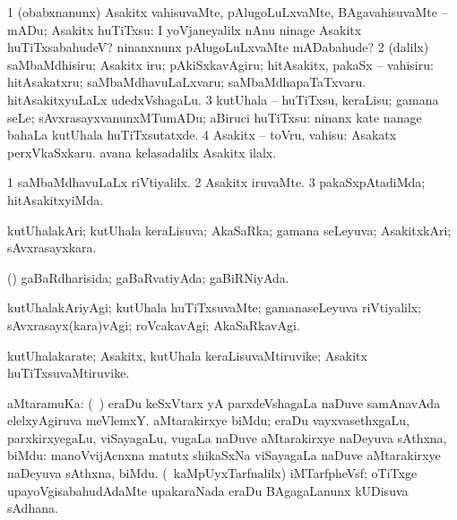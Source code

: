 \bentry
{}
\gl{\sakirx}
\bmng
\bnum
\num{1} (obabxnanunx) Asakitx vahisuvaMte, pAlugoLuLxvaMte, BAgavahisuvaMte -- mADu; Asakitx huTiTxsu:  I yoVjaneyalilx nAnu ninage Asakitx huTiTxsabahudeV? ninanxnunx pAlugoLuLxvaMte mADabahude? 
\num{2} (\BUkaq dalilx) saMbaMdhisiru; Asakitx iru; pAkiSxkavAgiru; hitAsakitx, pakaSx -- vahisiru:  hitAsakatxru; saMbaMdhavuLaLxvaru; saMbaMdhapaTaTxvaru.  hitAsakitxyuLaLx udedxVshagaLu. 
\num{3} kutUhala -- huTiTxsu, keraLisu; gamana seLe; sAvxrasayxvanunxMTumADu; aBiruci huTiTxsu:  ninanx kate nanage bahaLa kutUhala huTiTxsutatxde. 
\num{4} Asakitx -- toVru, vahisu:  Asakatx perxVkaSxkaru.  avana kelasadalilx Asakitx ilalx. 
\enum
\emng
\eentry

\bentry
{}
\gl{\kirxvi}
\bmng
\bnum
\num{1} saMbaMdhavuLaLx riVtiyalilx. 
\num{2} Asakitx iruvaMte. 
\num{3} pakaSxpAtadiMda; hitAsakitxyiMda. 
\enum
\emng
\eentry

\bentry
{}
\gl{\gu}
\bmng
kutUhalakAri; kutUhala keraLisuva; AkaSaRka; gamana seLeyuva; AsakitxkAri; sAvxrasayxkara. 
\emng

\noindent
\gl{\nuga}
\bmng
{} (\pArxparx) gaBaRdharisida; gaBaRvatiyAda; gaBiRNiyAda. 
\emng
\eentry

\bentry
{}
\gl{\kirxvi}
\bmng
kutUhalakAriyAgi; kutUhala huTiTxsuvaMte; gamanaseLeyuva riVtiyalilx; sAvxrasayx(kara)vAgi; roVcakavAgi; AkaSaRkavAgi. 
\emng
\eentry

\bentry
{}
\gl{\nA}
\bmng
kutUhalakarate; Asakitx, kutUhala keraLisuvaMtiruvike; Asakitx huTiTxsuvaMtiruvike. 
\emng
\eentry

\bentry
{}
\gl{\nA}
\bmng
aMtaramuKa: 
\banum
{} (\kanmu\ \Bwvi) eraDu keSxVtarx yA parxdeVshagaLa naDuve samAnavAda elelxyAgiruva meVlemxY. 
 aMtarakirxye biMdu; eraDu vayxvasethxgaLu, parxkirxyegaLu, viSayagaLu, \mo vugaLa naDuve aMtarakirxye naDeyuva sAthxna, biMdu:  manoVvijAcnxna matutx shikaSxNa viSayagaLa naDuve aMtarakirxye naDeyuva sAthxna, biMdu. 
 (\kanmu\ kaMpUyxTarfnalilx) iMTarfpheVsf; oTiTxge upayoVgisabahudAdaMte upakaraNada eraDu BAgagaLanunx kUDisuva sAdhana. 
\eanum
\emng
\eentry

